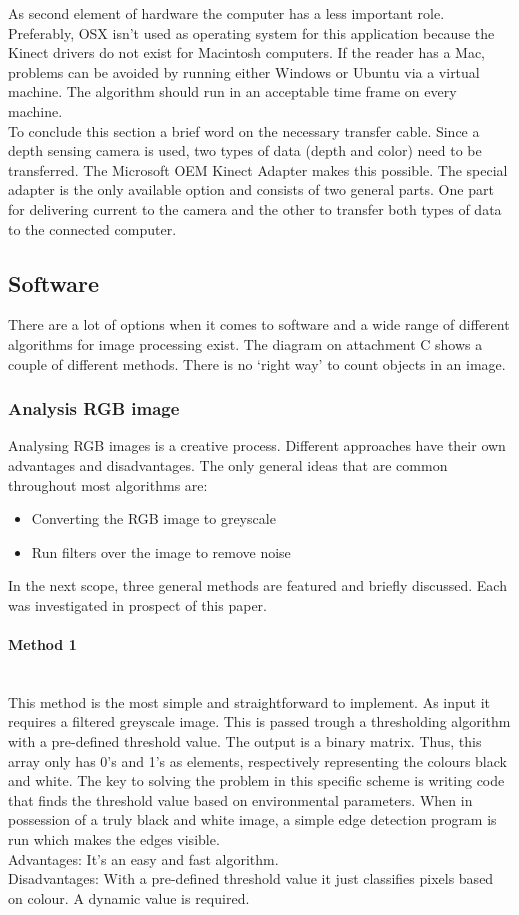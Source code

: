 \documentclass[11pt]{article}
\begin{document}
As second element of hardware the computer has a less important role. Preferably, OSX isn't used as operating system for this application because the Kinect drivers do not exist for Macintosh computers. If the reader has a Mac, problems can be avoided by running either Windows or Ubuntu via a virtual machine. The algorithm should run in an acceptable time frame on every machine.\\
To conclude this section a brief word on the necessary transfer cable. Since a depth sensing camera is used, two types of data (depth and color) need to be transferred. The Microsoft OEM Kinect Adapter makes this possible. The special adapter is the only available option and consists of two general parts. One part for delivering current to the camera and the other to transfer both types of data to the connected computer.


\subsection{Software}
There are a lot of options when it comes to software and a wide range of different algorithms for image processing exist. The diagram on attachment C shows a couple of different methods. There is no ‘right way’ to count objects in an image.
\subsubsection{Analysis RGB image}
Analysing RGB images is a creative process. Different approaches have their own advantages and disadvantages. The only general ideas that are common throughout most algorithms are:
\begin{itemize}
\item Converting the RGB image to greyscale
\item Run filters over the image to remove noise
\end{itemize}
In the next scope, three general methods are featured and briefly discussed. Each was investigated in prospect of this paper. 
\paragraph{Method 1}\mbox{}\\
This method is the most simple and straightforward to implement. As input it requires a filtered greyscale image. This is passed trough a thresholding algorithm with a pre-defined threshold value. The output is a binary matrix. Thus, this array only has 0's and 1's as elements, respectively representing the colours black and white. The key to solving the problem in this specific scheme is writing code that finds the threshold value based on environmental parameters. When in possession of a truly black and white image, a simple edge detection program is run which makes the edges visible.
\\Advantages: It’s an easy and fast algorithm.
\\Disadvantages: With a pre-defined threshold value it just classifies pixels based on colour. A dynamic value is required.
\end{document}
